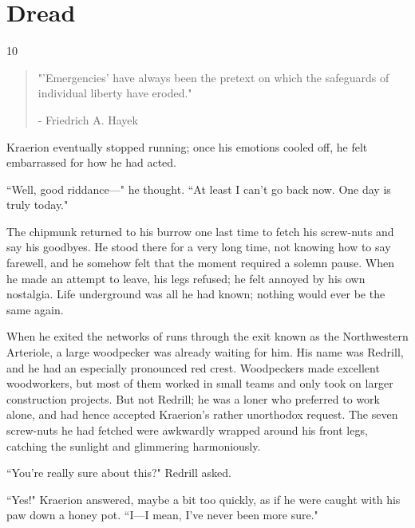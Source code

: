 \chapter{Dread}

\vspace{-1.3cm}
\begin{localsize}{10}
	\begin{quote}
		"'Emergencies' have always been the pretext on which the safeguards of individual liberty have eroded."
		\begin{flushright}- Friedrich A. Hayek\end{flushright}
	\end{quote} 
\end{localsize}
\vspace{1cm}

\renewcommand*{\thepage}{\footnotesize \hexadecimal{page}}

Kraerion eventually stopped running; once his emotions cooled off, he felt embarrassed for how he had acted.

``Well, good riddance---" he thought. ``At least I can't go back now.
One day is truly today."

The chipmunk returned to his burrow one last time to fetch his screw-nuts and say his goodbyes.
He stood there for a very long time, not knowing how to say farewell, and he somehow felt that the moment required a solemn pause.
When he made an attempt to leave, his legs refused; he felt annoyed by his own nostalgia.
Life underground was all he had known; nothing would ever be the same again.

When he exited the networks of runs through the exit known as the Northwestern Arteriole, a large woodpecker was already waiting for him.
His name was Redrill, and he had an especially pronounced red crest.
Woodpeckers made excellent woodworkers, but most of them worked in small teams and only took on larger construction projects.
But not Redrill; he was a loner who preferred to work alone, and had hence accepted Kraerion's rather unorthodox request.
The seven screw-nuts he had fetched were awkwardly wrapped around his front legs, catching the sunlight and glimmering harmoniously.

\renewcommand*{\thepage}{\footnotesize \arabic{page}}

``You're really sure about this?" Redrill asked.

``Yes!" Kraerion answered, maybe a bit too quickly, as if he were caught with his paw down a honey pot. ``I---I mean, I've never been more sure."

